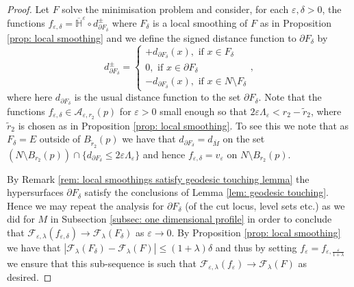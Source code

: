 \documentclass[11pt]{article}
\begin{document}
\begin{proof}
Let $F$ solve the minimisation problem and consider, for each $\varepsilon, \delta > 0$, the functions $f_{\varepsilon,\delta} = \overline{\mathbb{H}}^\varepsilon \circ d^\pm_{\partial F_\delta}$ where $F_\delta$ is a local smoothing of $F$ as in Proposition \ref{prop: local smoothing} and we define the signed distance function to $\partial F_\delta$ by \begin{equation*}
    d^\pm_{\partial F_\delta} = 
    \begin{cases}
    + d_{\partial F_\delta} (x), \text{ if } x \in F_\delta\\
    0, \text{ if } x \in \partial F_\delta\\
    - d_{\partial F_\delta} (x), \text{ if } x \in N \setminus F_\delta
    \end{cases},
\end{equation*}
where here $d_{\partial F_\delta}$ is the usual distance function to the set $\partial F_\delta$. Note that the functions $ f_{\varepsilon,\delta} \in \mathcal{A}_{\varepsilon,r_2}(p)$ for $\varepsilon > 0$ small enough so that $2\varepsilon \Lambda_\varepsilon < r_2 - \tilde{r}_2$, where $\tilde{r}_2$ is chosen as in Proposition \ref{prop: local smoothing}. To see this we note that as $F_\delta= E$ outside of $B_{\tilde{r}_2}(p)$ we have that $d_{\partial F_\delta} = d_{\overline{M}}$ on the set $(N \setminus B_{r_2}(p)) \cap \{d_{\partial F_\delta} \leq 2\varepsilon\Lambda_\varepsilon\}$ and hence $f_{\varepsilon,\delta} = v_\varepsilon$ on  $N \setminus B_{r_2}(p)$.

\bigskip

By Remark \ref{rem: local smoothings satisfy geodesic touching lemma} the hypersurfaces $\partial F_\delta$ satisfy the conclusions of Lemma \ref{lem: geodesic touching}. Hence we may repeat the analysis for $\partial F_\delta$ (of the cut locus, level sets etc.) as we did for $M$ in Subsection \ref{subsec: one dimensional profile} in order to conclude that $\mathcal{F}_{\varepsilon,\lambda}(f_{\varepsilon,\delta}) \rightarrow \mathcal{F}_\lambda(F_\delta)$ as $\varepsilon \rightarrow 0$. By Proposition \ref{prop: local smoothing} we have that $|\mathcal{F}_\lambda(F_\delta) - \mathcal{F}_\lambda(F)| \leq (1+ \lambda)\delta$ and thus by setting $f_\varepsilon = f_{\varepsilon,\frac{\varepsilon}{1 + \lambda}}$ we ensure that this sub-sequence is such that $\mathcal{F}_{\varepsilon,\lambda}(f_\varepsilon) \rightarrow \mathcal{F}_\lambda(F)$ as desired.


\end{proof}
\end{document}
